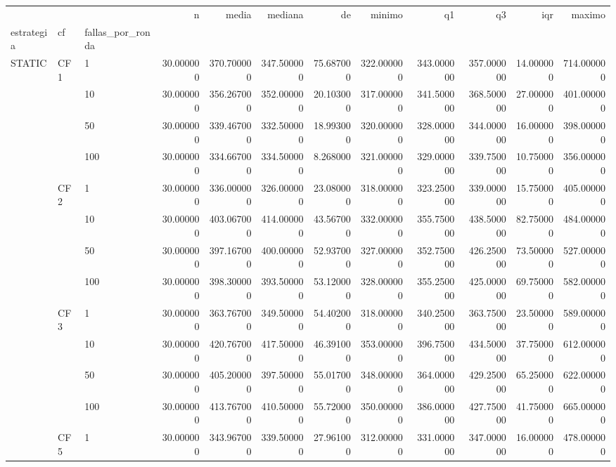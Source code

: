 \begin{tabular}{lllrrrrrrrrr}
\toprule
 &  &  & n & media & mediana & de & minimo & q1 & q3 & iqr & maximo \\
estrategia & cf & fallas_por_ronda &  &  &  &  &  &  &  &  &  \\
\midrule
\multirow[t]{16}{*}{STATIC} & \multirow[t]{4}{*}{CF1} & 1 & 30.000000 & 370.700000 & 347.500000 & 75.687000 & 322.000000 & 343.000000 & 357.000000 & 14.000000 & 714.000000 \\
 &  & 10 & 30.000000 & 356.267000 & 352.000000 & 20.103000 & 317.000000 & 341.500000 & 368.500000 & 27.000000 & 401.000000 \\
 &  & 50 & 30.000000 & 339.467000 & 332.500000 & 18.993000 & 320.000000 & 328.000000 & 344.000000 & 16.000000 & 398.000000 \\
 &  & 100 & 30.000000 & 334.667000 & 334.500000 & 8.268000 & 321.000000 & 329.000000 & 339.750000 & 10.750000 & 356.000000 \\
\cline{2-12}
 & \multirow[t]{4}{*}{CF2} & 1 & 30.000000 & 336.000000 & 326.000000 & 23.080000 & 318.000000 & 323.250000 & 339.000000 & 15.750000 & 405.000000 \\
 &  & 10 & 30.000000 & 403.067000 & 414.000000 & 43.567000 & 332.000000 & 355.750000 & 438.500000 & 82.750000 & 484.000000 \\
 &  & 50 & 30.000000 & 397.167000 & 400.000000 & 52.937000 & 327.000000 & 352.750000 & 426.250000 & 73.500000 & 527.000000 \\
 &  & 100 & 30.000000 & 398.300000 & 393.500000 & 53.120000 & 328.000000 & 355.250000 & 425.000000 & 69.750000 & 582.000000 \\
\cline{2-12}
 & \multirow[t]{4}{*}{CF3} & 1 & 30.000000 & 363.767000 & 349.500000 & 54.402000 & 318.000000 & 340.250000 & 363.750000 & 23.500000 & 589.000000 \\
 &  & 10 & 30.000000 & 420.767000 & 417.500000 & 46.391000 & 353.000000 & 396.750000 & 434.500000 & 37.750000 & 612.000000 \\
 &  & 50 & 30.000000 & 405.200000 & 397.500000 & 55.017000 & 348.000000 & 364.000000 & 429.250000 & 65.250000 & 622.000000 \\
 &  & 100 & 30.000000 & 413.767000 & 410.500000 & 55.720000 & 350.000000 & 386.000000 & 427.750000 & 41.750000 & 665.000000 \\
\cline{2-12}
 & \multirow[t]{4}{*}{CF5} & 1 & 30.000000 & 343.967000 & 339.500000 & 27.961000 & 312.000000 & 331.000000 & 347.000000 & 16.000000 & 478.000000 \\

\end{tabular}
